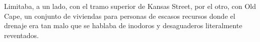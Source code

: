 \sk
Limitaba, a un lado, con el tramo
superior de Kansas Street, por el otro, con Old
Cape, un conjunto de viviendas para personas de
escasos recursos donde el drenaje era tan malo
que se hablaba de inodoros y desaguaderos
literalmente reventados.

\sk
\nb{}

\sk
\nb{}

\sk
\nb{}

\sk
\nb{}

\sk
\nb{}

\sk
\nb{}

\sk
\nb{}

\sk
\nb{}

\sk
\nb{}

\sk
\nb{}

\sk
\nb{}

\sk
\nb{}

\sk
\nb{}

\sk
\nb{}

\sk
\nb{}

\sk
\nb{}

\sk
\nb{}

\sk
\nb{}

\sk
\nb{}

\sk
\nb{}

\sk
\nb{}

\sk
\nb{}


